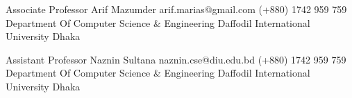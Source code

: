 

\begin{cvreferences}


  \cvreference
    {Associate Professor} %
    {Arif Mazumder} %
    {arif.marias@gmail.com} %
    {(+880) 1742 959 759} %
    {Department Of Computer Science \& Engineering}
    {Daffodil International University}
    {Dhaka}
    

  \cvreference
    {Assistant Professor} %
    {Naznin Sultana} %
    {naznin.cse@diu.edu.bd} %
    {(+880) 1742 959 759} %
    {Department Of Computer Science \& Engineering}
    {Daffodil International University}
    {Dhaka}



\end{cvreferences}

